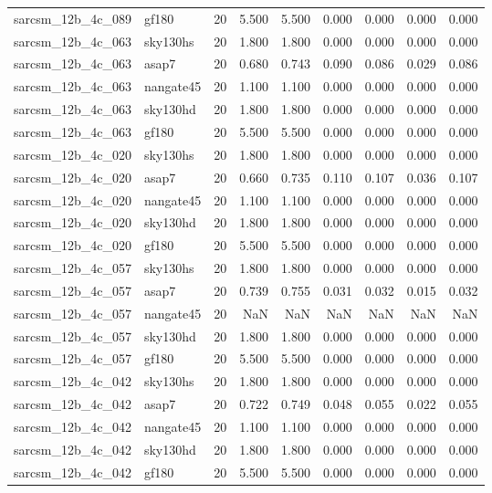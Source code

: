 \begin{tabular}{llrrrrrrr}
sarcsm\_12b\_4c\_089 & gf180 & 20 & 5.500 & 5.500 & 0.000 & 0.000 & 0.000 & 0.000 \\
sarcsm\_12b\_4c\_063 & sky130hs & 20 & 1.800 & 1.800 & 0.000 & 0.000 & 0.000 & 0.000 \\
sarcsm\_12b\_4c\_063 & asap7 & 20 & 0.680 & 0.743 & 0.090 & 0.086 & 0.029 & 0.086 \\
sarcsm\_12b\_4c\_063 & nangate45 & 20 & 1.100 & 1.100 & 0.000 & 0.000 & 0.000 & 0.000 \\
sarcsm\_12b\_4c\_063 & sky130hd & 20 & 1.800 & 1.800 & 0.000 & 0.000 & 0.000 & 0.000 \\
sarcsm\_12b\_4c\_063 & gf180 & 20 & 5.500 & 5.500 & 0.000 & 0.000 & 0.000 & 0.000 \\
sarcsm\_12b\_4c\_020 & sky130hs & 20 & 1.800 & 1.800 & 0.000 & 0.000 & 0.000 & 0.000 \\
sarcsm\_12b\_4c\_020 & asap7 & 20 & 0.660 & 0.735 & 0.110 & 0.107 & 0.036 & 0.107 \\
sarcsm\_12b\_4c\_020 & nangate45 & 20 & 1.100 & 1.100 & 0.000 & 0.000 & 0.000 & 0.000 \\
sarcsm\_12b\_4c\_020 & sky130hd & 20 & 1.800 & 1.800 & 0.000 & 0.000 & 0.000 & 0.000 \\
sarcsm\_12b\_4c\_020 & gf180 & 20 & 5.500 & 5.500 & 0.000 & 0.000 & 0.000 & 0.000 \\
sarcsm\_12b\_4c\_057 & sky130hs & 20 & 1.800 & 1.800 & 0.000 & 0.000 & 0.000 & 0.000 \\
sarcsm\_12b\_4c\_057 & asap7 & 20 & 0.739 & 0.755 & 0.031 & 0.032 & 0.015 & 0.032 \\
sarcsm\_12b\_4c\_057 & nangate45 & 20 & NaN & NaN & NaN & NaN & NaN & NaN \\
sarcsm\_12b\_4c\_057 & sky130hd & 20 & 1.800 & 1.800 & 0.000 & 0.000 & 0.000 & 0.000 \\
sarcsm\_12b\_4c\_057 & gf180 & 20 & 5.500 & 5.500 & 0.000 & 0.000 & 0.000 & 0.000 \\
sarcsm\_12b\_4c\_042 & sky130hs & 20 & 1.800 & 1.800 & 0.000 & 0.000 & 0.000 & 0.000 \\
sarcsm\_12b\_4c\_042 & asap7 & 20 & 0.722 & 0.749 & 0.048 & 0.055 & 0.022 & 0.055 \\
sarcsm\_12b\_4c\_042 & nangate45 & 20 & 1.100 & 1.100 & 0.000 & 0.000 & 0.000 & 0.000 \\
sarcsm\_12b\_4c\_042 & sky130hd & 20 & 1.800 & 1.800 & 0.000 & 0.000 & 0.000 & 0.000 \\
sarcsm\_12b\_4c\_042 & gf180 & 20 & 5.500 & 5.500 & 0.000 & 0.000 & 0.000 & 0.000 \\

\end{tabular}
